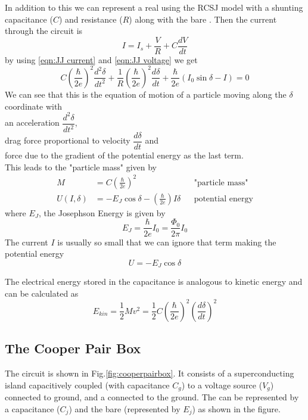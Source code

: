 In addition to this we can represent a real \JJ using the RCSJ model with a shunting capacitance ($C$) and resistance ($R$) along with the bare \JJ \cite{Harmans1997}. Then the current through the circuit is
\begin{equation}
I=I_s+\frac{V}{R}+C\frac{dV}{dt}
\end{equation}
by using \ref{eqn:JJ current} and \ref{eqn:JJ voltage} we get
\begin{equation}
C\left(\frac{\hbar}{2e}\right)^2\frac{d^2\delta}{dt^2}+\frac{1}{R}\left(\frac{\hbar}{2e}\right)^2\frac{d\delta}{dt}+\frac{\hbar}{2e}(I_0\sin\delta-I)=0
\end{equation}
We can see that this is the equation of motion of a particle moving along the $\delta$ coordinate with\\ an acceleration $\dfrac{d^2\delta}{dt^2}$,\\ drag force proportional to velocity $\dfrac{d\delta}{dt}$ and\\ force due to the gradient of the potential energy as the last term.\\
This leads to the "particle mass" given by
\begin{align}
M&=C\left(\frac{\hbar}{2e}\right)^2&&\text{"particle mass"}\\
U(I,\delta)&=-E_J\cos\delta-\left(\frac{\hbar}{2e}\right)I\delta&&\text{potential energy}
\end{align}
where $E_J$, the Josephson Energy is given by
\begin{equation}
E_J=\frac{\hbar}{2e}I_0=\frac{\Phi_0}{2\pi}I_0
\label{eqn:junction energy}
\end{equation}
The current $I$ is usually so small that we can ignore that term making the potential energy
\begin{equation}
U=-E_J\cos\delta
\label{eqn:JJ potential energy}
\end{equation}

The electrical energy stored in the capacitance is analogous to kinetic energy and can be calculated as
\begin{equation}
E_{kin}=\frac{1}{2}Mv^2=\frac{1}{2}C\left(\frac{\hbar}{2e}\right)^2\left(\frac{d\delta}{dt}\right)^2
\end{equation}

\subsection{The Cooper Pair Box}

The \CPB circuit is shown in Fig.\ref{fig:cooperpairbox}. It consists of a superconducting island capacitively coupled (with capacitance $C_g$) to a voltage source ($V_g$) connected to ground, and a \JJ connected to the ground. The \JJ can be represented by a capacitance ($C_j$) and the bare \JJ (represented by $E_j$) as shown in the figure.

